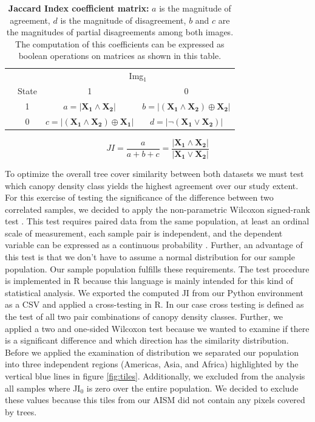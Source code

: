 			\begin{table}[ht]
				\centering
				\caption[Jaccard Index coefficient matrix]{\textbf{Jaccard Index coefficient matrix:} $a$ is the magnitude of agreement, $d$ is the magnitude of disagreement, $b$ and $c$ are the magnitudes of partial disagreements among both images. The computation of this coefficients can be expressed as boolean operations on matrices as shown in this table.}
				\label{tab:jaccardmatrix}
				\begin{tabular}{lccc}
					\hline
					& & \multicolumn{2}{c}{Img$_1$} \\
					& State & 1 & 0 \\\hline
					\multirow{2}{*}{\STAB{\rotatebox[origin=c]{90}{Img$_2$}}} & 1 & $a=|\mathbf{X_1} \land \mathbf{X_2}|$ & $b=|(\mathbf{X_1} \land \mathbf{X_2}) \oplus \mathbf{X_2}| $ \\ 
					& 0 & $c=|(\mathbf{X_1} \land \mathbf{X_2}) \oplus \mathbf{X_1}|$ & $d=|\neg ( \mathbf{X_1} \lor \mathbf{X_2})|$ \\\hline 
				\end{tabular}
			\end{table}
			\begin{equation}
			\label{eq:jaccard}
				JI = \frac{a}{a+b+c} = \frac{|\mathbf{X_1} \land \mathbf{X_2}|}{|\mathbf{X_1} \lor \mathbf{X_2}|}
			\end{equation}

			To optimize the overall tree cover similarity between both datasets we must test which canopy density class yields the highest agreement over our study extent. For this exercise of testing the significance of the difference between two correlated samples, we decided to apply the non-parametric Wilcoxon signed-rank test \citep{Wilcoxon1945}. This test requires paired data from the same population, at least an ordinal scale of measurement, each sample pair is independent, and the dependent variable can be expressed as a continuous probability \citep{Lowry2019}. Further, an advantage of this test is that we don't have to assume a normal distribution for our sample population. Our sample population fulfills these requirements. The test procedure is implemented in R because this language is mainly intended for this kind of statistical analysis. We exported the computed \ac{JI} from our Python environment as a \ac{CSV} and applied a cross-testing in R. In our case cross testing is defined as the test of all two pair combinations of canopy density classes. Further, we applied a two and one-sided Wilcoxon test because we wanted to examine if there is a significant difference and which direction has the similarity distribution. Before we applied the examination of distribution we separated our population into three independent regions (Americas, Asia, and Africa) highlighted by the vertical blue lines in figure \ref{fig:tiles}. Additionally, we excluded from the analysis all samples where JI$_0$ is zero over the entire population. We decided to exclude these values because this tiles from our \ac{AISM} did not contain any pixels covered by trees.
 
